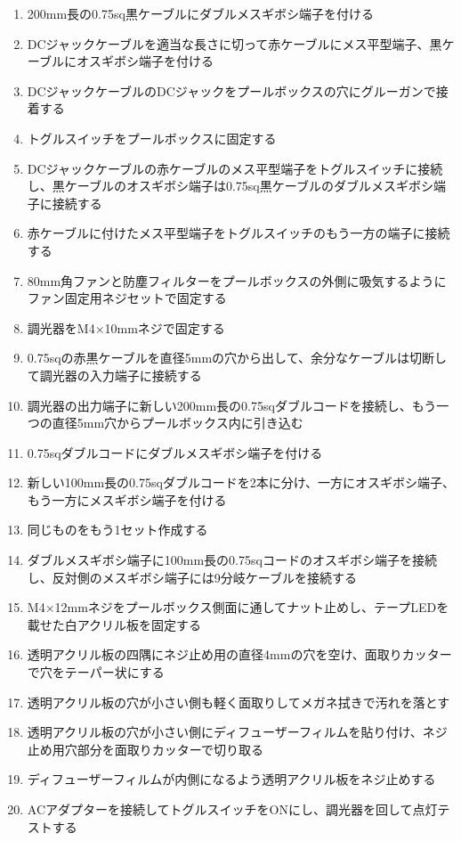 \documentclass[titlepage,10pt,a4paper,uplatex]{jsbook}
\begin{document}
\begin{enumerate}
\item 200mm長の0.75sq黒ケーブルにダブルメスギボシ端子を付ける
\item DCジャックケーブルを適当な長さに切って赤ケーブルにメス平型端子、黒ケーブルにオスギボシ端子を付ける
\item DCジャックケーブルのDCジャックをプールボックスの穴にグルーガンで接着する
\item トグルスイッチをプールボックスに固定する
\item DCジャックケーブルの赤ケーブルのメス平型端子をトグルスイッチに接続し、黒ケーブルのオスギボシ端子は0.75sq黒ケーブルのダブルメスギボシ端子に接続する
\item 赤ケーブルに付けたメス平型端子をトグルスイッチのもう一方の端子に接続する
\item 80mm角ファンと防塵フィルターをプールボックスの外側に吸気するようにファン固定用ネジセットで固定する
\item 調光器をM4×10mmネジで固定する
\item 0.75sqの赤黒ケーブルを直径5mmの穴から出して、余分なケーブルは切断して調光器の入力端子に接続する
\item 調光器の出力端子に新しい200mm長の0.75sqダブルコードを接続し、もう一つの直径5mm穴からプールボックス内に引き込む
\item 0.75sqダブルコードにダブルメスギボシ端子を付ける
\item 新しい100mm長の0.75sqダブルコードを2本に分け、一方にオスギボシ端子、もう一方にメスギボシ端子を付ける
\item 同じものをもう1セット作成する
\item ダブルメスギボシ端子に100mm長の0.75sqコードのオスギボシ端子を接続し、反対側のメスギボシ端子には9分岐ケーブルを接続する
\item M4×12mmネジをプールボックス側面に通してナット止めし、テープLEDを載せた白アクリル板を固定する
\item 透明アクリル板の四隅にネジ止め用の直径4mmの穴を空け、面取りカッターで穴をテーパー状にする
\item 透明アクリル板の穴が小さい側も軽く面取りしてメガネ拭きで汚れを落とす
\item 透明アクリル板の穴が小さい側にディフューザーフィルムを貼り付け、ネジ止め用穴部分を面取りカッターで切り取る
\item ディフューザーフィルムが内側になるよう透明アクリル板をネジ止めする
\item ACアダプターを接続してトグルスイッチをONにし、調光器を回して点灯テストする
\end{enumerate}
\end{document}
